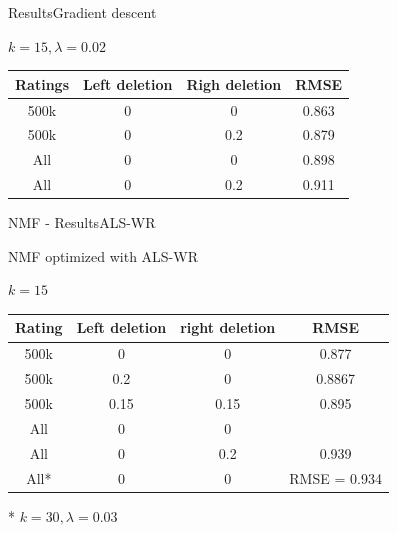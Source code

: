 \documentclass{beamer} %
\begin{document}
\begin{frame}{Results}{Gradient descent}

$k = 15, \lambda = 0.02$
 \begin{center}
    \begin{tabular}{|c|c|c|c|}

       \hline
       Ratings & Left deletion & Righ deletion & RMSE \\
       \hline
       500k & 0 & 0 & 0.863 \\
       500k & 0 & 0.2 & 0.879\\

       All & 0 & 0 & 0.898 \\
       All & 0 & 0.2 & 0.911 \\      
       \hline
    \end{tabular}
  \end{center}
\end{frame}

\begin{frame}{NMF - Results}{ALS-WR}

NMF optimized with ALS-WR

$k = 15$

  \begin{center}
    \begin{tabular}{|c|c|c|c|}

       \hline
       Rating & Left deletion & right deletion & RMSE \\
       \hline
       500k & 0 & 0 & 0.877 \\
       500k & 0.2 & 0 & 0.8867 \\
       500k & 0.15 & 0.15 & 0.895 \\
       All & 0 & 0 &  \\
       All &  0  &  0.2 &   0.939 \\
       All* & 0  & 0 & RMSE = 0.934 \\
       \hline
    \end{tabular}
  \end{center}
  
  * $k = 30, \lambda = 0.03$

\end{frame}
\end{document}
